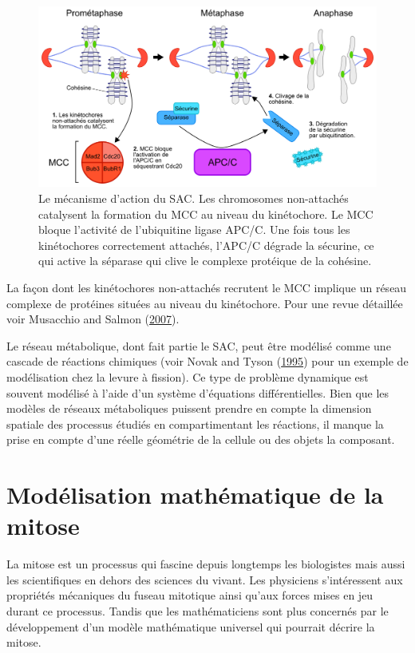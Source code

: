 \documentclass[12pt,a4paper,twoside,openright]{book}
\begin{document}
\begin{figure}[htbp]
\centering
\includegraphics{figures/intro/sac.png}
\caption[Le mécanisme d'action du SAC]{\label{fig:sac}Le mécanisme
d'action du SAC. Les chromosomes non-attachés catalysent la formation du
MCC au niveau du kinétochore. Le MCC bloque l'activité de l'ubiquitine
ligase APC/C. Une fois tous les kinétochores correctement attachés,
l'APC/C dégrade la sécurine, ce qui active la séparase qui clive le
complexe protéique de la cohésine.}
\end{figure}

La façon dont les kinétochores non-attachés recrutent le MCC implique un
réseau complexe de protéines situées au niveau du kinétochore. Pour une
revue détaillée voir Musacchio and Salmon
(\protect\hyperlink{ref-Musacchio2007}{2007}).

Le réseau métabolique, dont fait partie le SAC, peut être modélisé comme
une cascade de réactions chimiques (voir Novak and Tyson
(\protect\hyperlink{ref-Novak1995}{1995}) pour un exemple de
modélisation chez la levure à fission). Ce type de problème dynamique
est souvent modélisé à l'aide d'un système d'équations différentielles.
Bien que les modèles de réseaux métaboliques puissent prendre en compte
la dimension spatiale des processus étudiés en compartimentant les
réactions, il manque la prise en compte d'une réelle géométrie de la
cellule ou des objets la composant.

\section{Modélisation mathématique de la
mitose}\label{moduxe9lisation-mathuxe9matique-de-la-mitose}

La mitose est un processus qui fascine depuis longtemps les biologistes
mais aussi les scientifiques en dehors des sciences du vivant. Les
physiciens s'intéressent aux propriétés mécaniques du fuseau mitotique
ainsi qu'aux forces mises en jeu durant ce processus. Tandis que les
mathématiciens sont plus concernés par le développement d'un modèle
mathématique universel qui pourrait décrire la mitose.
\end{document}

